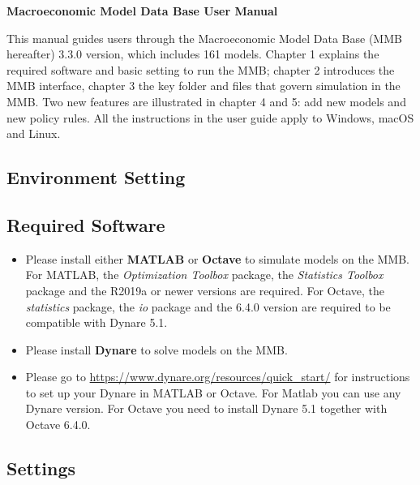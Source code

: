\documentclass[10pt,a4paper]{article}
\begin{document}
\begin{center}
\textbf{{\LARGE Macroeconomic Model Data Base User Manual}}
\end{center}
\bigskip
This manual guides users through the Macroeconomic Model Data Base (MMB hereafter) 3.3.0 version, which includes 161 models. Chapter 1 explains the required software and basic setting to run the MMB; chapter 2 introduces the MMB interface, chapter 3 the key folder and files that govern simulation in the MMB. Two new features are illustrated in chapter 4 and 5: add new models and new policy rules. All the instructions in the user guide apply to Windows, macOS and Linux.
\medskip

\begin{flushleft}
\section{Environment Setting}
\end{flushleft}
\medskip

\subsection{Required Software}
\medskip

\begin{itemize}
\item Please install either \textbf{MATLAB} or \textbf{Octave} to simulate models on the MMB. For MATLAB, the \textit{Optimization Toolbox} package, the \textit{Statistics Toolbox} package and the R2019a or newer versions are required. For Octave, the \textit{statistics} package, the \textit{io} package and the 6.4.0 version are required to be compatible with Dynare 5.1.

\item Please install \textbf{Dynare} to solve models on the MMB.

\item Please go to \url{https://www.dynare.org/resources/quick_start/} for instructions to set up your Dynare in MATLAB or Octave. For Matlab you can use any Dynare version. For Octave you need to install Dynare 5.1 together with Octave 6.4.0.
\end{itemize}

\subsection{Settings}
\medskip
\end{document}
